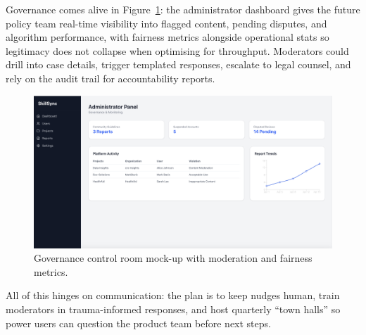 Governance comes alive in Figure~\ref{fig:admin-panel}: the administrator dashboard gives the future policy team real-time visibility into flagged content, pending disputes, and algorithm performance, with fairness metrics alongside operational stats so legitimacy does not collapse when optimising for throughput. Moderators could drill into case details, trigger templated responses, escalate to legal counsel, and rely on the audit trail for accountability reports.

\begin{figure}[H]
  \centering
  \includegraphics[width=0.85\linewidth]{figures/Organisation-Administratorpanel.png}
  \caption{Governance control room mock-up with moderation and fairness metrics.}
  \label{fig:admin-panel}
\end{figure}

All of this hinges on communication: the plan is to keep nudges human, train moderators in trauma-informed responses, and host quarterly ``town halls'' so power users can question the product team before next steps.

